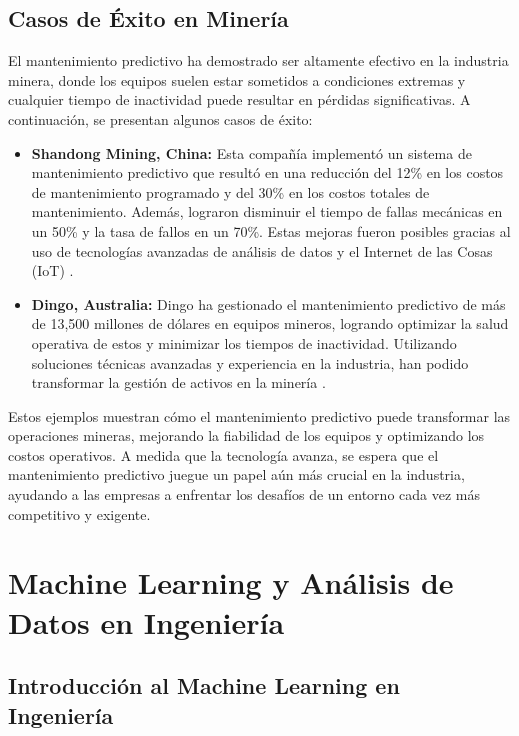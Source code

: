 \subsection{Casos de Éxito en Minería}

El mantenimiento predictivo ha demostrado ser altamente efectivo en la industria minera, donde los equipos suelen estar sometidos a condiciones extremas y cualquier tiempo de inactividad puede resultar en pérdidas significativas. A continuación, se presentan algunos casos de éxito:

\begin{itemize}
    \item \textbf{Shandong Mining, China:} Esta compañía implementó un sistema de mantenimiento predictivo que resultó en una reducción del 12\% en los costos de mantenimiento programado y del 30\% en los costos totales de mantenimiento. Además, lograron disminuir el tiempo de fallas mecánicas en un 50\% y la tasa de fallos en un 70\%. Estas mejoras fueron posibles gracias al uso de tecnologías avanzadas de análisis de datos y el Internet de las Cosas (IoT) \cite{li2020shandong}.
    
    \item \textbf{Dingo, Australia:} Dingo ha gestionado el mantenimiento predictivo de más de 13,500 millones de dólares en equipos mineros, logrando optimizar la salud operativa de estos y minimizar los tiempos de inactividad. Utilizando soluciones técnicas avanzadas y experiencia en la industria, han podido transformar la gestión de activos en la minería \cite{dingomaint2022}.
\end{itemize}

Estos ejemplos muestran cómo el mantenimiento predictivo puede transformar las operaciones mineras, mejorando la fiabilidad de los equipos y optimizando los costos operativos. A medida que la tecnología avanza, se espera que el mantenimiento predictivo juegue un papel aún más crucial en la industria, ayudando a las empresas a enfrentar los desafíos de un entorno cada vez más competitivo y exigente.


\section{Machine Learning y Análisis de Datos en Ingeniería}

\subsection{Introducción al Machine Learning en Ingeniería}

